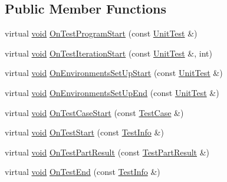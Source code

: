 \subsection*{Public Member Functions}
\begin{DoxyCompactItemize}
\item 
virtual \hyperlink{legacy_8hpp_a8bb47f092d473522721002c86c13b94e}{void} \hyperlink{classtesting_1_1EmptyTestEventListener_aa3847c8a3c22d8d69a6006dfdd6589fc}{On\-Test\-Program\-Start} (const \hyperlink{classtesting_1_1UnitTest}{Unit\-Test} \&)
\item 
virtual \hyperlink{legacy_8hpp_a8bb47f092d473522721002c86c13b94e}{void} \hyperlink{classtesting_1_1EmptyTestEventListener_a836f05829855dc60d13ba99ad712c0dd}{On\-Test\-Iteration\-Start} (const \hyperlink{classtesting_1_1UnitTest}{Unit\-Test} \&, int)
\item 
virtual \hyperlink{legacy_8hpp_a8bb47f092d473522721002c86c13b94e}{void} \hyperlink{classtesting_1_1EmptyTestEventListener_a156d1965248fbdced6aabacadfa2d63f}{On\-Environments\-Set\-Up\-Start} (const \hyperlink{classtesting_1_1UnitTest}{Unit\-Test} \&)
\item 
virtual \hyperlink{legacy_8hpp_a8bb47f092d473522721002c86c13b94e}{void} \hyperlink{classtesting_1_1EmptyTestEventListener_abc481c6648d15d4242245195a06f5aa0}{On\-Environments\-Set\-Up\-End} (const \hyperlink{classtesting_1_1UnitTest}{Unit\-Test} \&)
\item 
virtual \hyperlink{legacy_8hpp_a8bb47f092d473522721002c86c13b94e}{void} \hyperlink{classtesting_1_1EmptyTestEventListener_ae4707ed9cc7ace5241bc8ccc4051209b}{On\-Test\-Case\-Start} (const \hyperlink{classtesting_1_1TestCase}{Test\-Case} \&)
\item 
virtual \hyperlink{legacy_8hpp_a8bb47f092d473522721002c86c13b94e}{void} \hyperlink{classtesting_1_1EmptyTestEventListener_a84fa74cc9ba742f9f847ea405ca84e5e}{On\-Test\-Start} (const \hyperlink{classtesting_1_1TestInfo}{Test\-Info} \&)
\item 
virtual \hyperlink{legacy_8hpp_a8bb47f092d473522721002c86c13b94e}{void} \hyperlink{classtesting_1_1EmptyTestEventListener_a59e7f7d9f2e2d089a6e8c1e2577f4718}{On\-Test\-Part\-Result} (const \hyperlink{classtesting_1_1TestPartResult}{Test\-Part\-Result} \&)
\item 
virtual \hyperlink{legacy_8hpp_a8bb47f092d473522721002c86c13b94e}{void} \hyperlink{classtesting_1_1EmptyTestEventListener_afd58d21005f0d0d0399fb114627545d3}{On\-Test\-End} (const \hyperlink{classtesting_1_1TestInfo}{Test\-Info} \&)
\item 

\end{DoxyCompactItemize}
